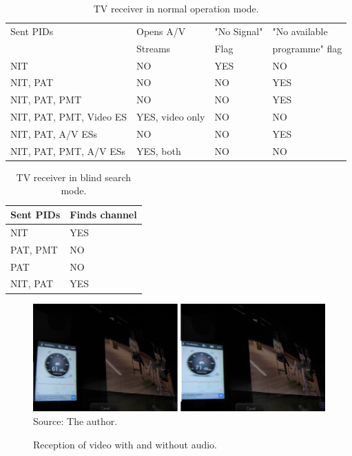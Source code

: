 \documentclass[12pt,a4paper]{article}
\begin{document}
\begin{table}
    \caption {TV receiver in normal operation mode.}
    \begin{center}
\begin{tabular}{|l|l|l|l|}
    \hline
    Sent PIDs               & Opens A/V & "No Signal" & "No available \\
                   & Streams & Flag & programme" flag \\ \hline
    NIT                     & NO                & YES              & NO                            \\ \hline
    NIT, PAT                & NO                & NO               & YES                           \\ \hline
    NIT, PAT, PMT           & NO                & NO               & YES                           \\ \hline
    NIT, PAT, PMT, Video ES & YES, video only   & NO               & NO                            \\ \hline
    NIT, PAT, A/V ESs  & NO         & NO               & YES                            \\ \hline
	NIT, PAT, PMT, A/V ESs  & YES, both         & NO               & NO                            \\ \hline
    \end{tabular}
	\label{tab_normal_operation}
\end{center}
\end{table}

\begin{table}
    \caption {TV receiver in blind search mode.}
    \begin{center}
\begin{tabular}{|l|l|}
    \hline
    Sent PIDs & Finds channel \\ \hline
    NIT       & YES           \\ \hline
    PAT, PMT  & NO            \\ \hline
    PAT       & NO            \\ \hline
    NIT, PAT  & YES           \\ \hline
    \end{tabular}
	\label{tab_blind_search}
\end{center}
\end{table}

\begin{figure}[!h]
\centering
\includegraphics[width=0.9\linewidth]{pictures/video_audio_both.jpg}
\\Source: The author.
\caption{Reception of video with and without audio.}
\label{fig:video_audio_both}
\end{figure}
\end{document}
